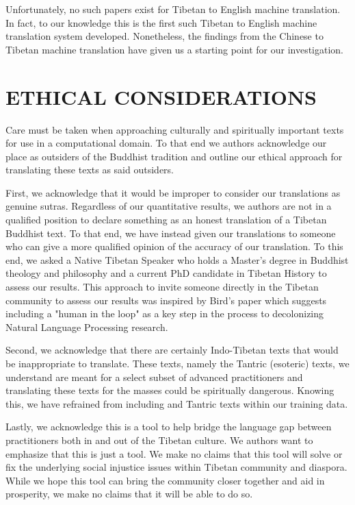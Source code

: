 \documentclass[letterpaper, 12 pt, conference]{ieeeconf}  %
\begin{document}
Unfortunately, no such papers exist for Tibetan to English machine translation. In fact, to our knowledge this is the first such Tibetan to English machine translation system developed.  Nonetheless, the findings from the Chinese to Tibetan machine translation have given us a starting point for our investigation.  



\section{ETHICAL CONSIDERATIONS}

Care must be taken when approaching culturally and spiritually important texts for use in a computational domain. To that end we authors acknowledge our place as outsiders of the Buddhist tradition and outline our ethical approach for translating these texts as said outsiders.

First, we acknowledge that it would be improper to consider our translations as genuine sutras. Regardless of our quantitative results, we authors are not in a qualified position to declare something as an honest translation of a Tibetan Buddhist text. To that end, we have instead given our translations to someone who can give a more qualified opinion of the accuracy of our translation. To this end, we asked a Native Tibetan Speaker who holds a Master's degree in Buddhist theology and philosophy and a current PhD candidate in Tibetan History to  assess our results. This approach to invite someone directly in the Tibetan community to assess our results was inspired by Bird's paper \cite{c7} which suggests including a "human in the loop" as a key step in the process to decolonizing Natural Language Processing research. 

Second, we acknowledge that there are certainly Indo-Tibetan texts that would be inappropriate to translate. These texts, namely the Tantric (esoteric) texts, we understand are meant for a select subset of advanced practitioners and translating these texts for the masses could be spiritually dangerous. Knowing this, we have refrained from including and Tantric texts within our training data. 

Lastly, we acknowledge this is a tool to help bridge the language gap between practitioners both in and out of the Tibetan culture. We authors want to emphasize that this is just a tool. We make no claims that this tool will solve or fix the underlying social injustice issues within Tibetan community and diaspora. While we hope this tool can bring the community closer together and aid in prosperity, we make no claims that it will be able to do so. 
\end{document}
